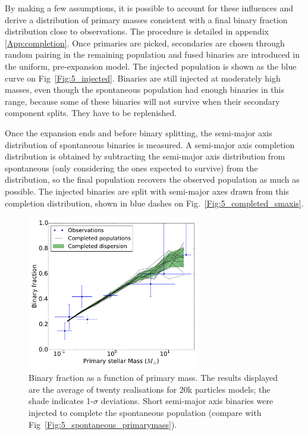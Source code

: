 By making a few assumptions, it is possible to account for these influences and derive a distribution of primary masses consistent with a final binary fraction distribution close to observations. The procedure is detailed in appendix \ref{App:completion}. Once primaries are picked, secondaries are chosen through random pairing in the remaining population and fused binaries are introduced in the uniform, pre-expansion model. The injected population is shown as the blue curve on Fig~\ref{Fig:5_injected}. Binaries are still injected at moderately high masses, even though the spontaneous population had enough binaries in this range, because some of these binaries will not survive when their secondary component splits. They have to be replenished.



Once the expansion ends and before binary splitting, the semi-major axis distribution of spontaneous binaries is measured. A semi-major axis completion distribution is obtained by subtracting the semi-major axis distribution from spontaneous (only considering the ones expected to survive) from the \cite{Raghavan2010} distribution, so the final population recovers the observed population as much as possible. The injected binaries are split with semi-major axes drawn from this completion distribution, shown in blue dashes on Fig.~\ref{Fig:5_completed_smaxis}. 




\begin{figure}
\begin{center}
\includegraphics[width=0.67\textwidth]{Figures/5_completed_primarymass}
\caption[Completed binary population: fraction vs primary mass]{Binary fraction as a function of primary mass. The results displayed are the average of twenty realisations for 20k particles models; the shade indicates 1-$\sigma$ deviations. Short semi-major axis binaries were injected to complete the spontaneous population (compare with Fig~\protect\ref{Fig:5_spontaneous_primarymass}).}
\label{Fig:5_completed_primarymass}
\end{center}
\end{figure}

